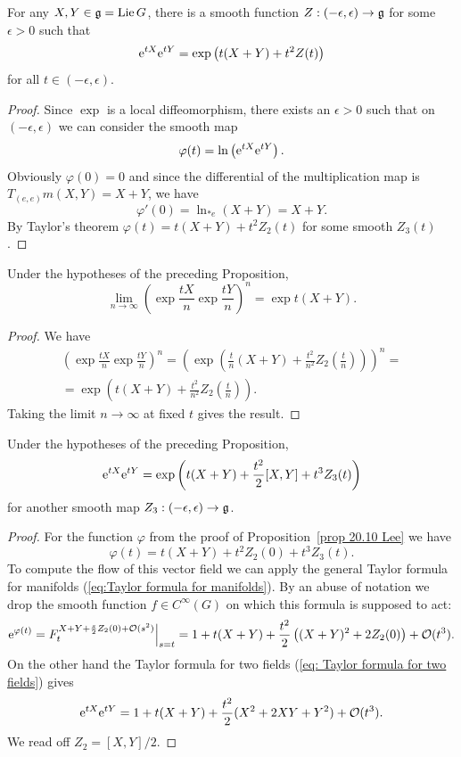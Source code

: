 \begin{prop}\label{prop 20.10 Lee}
    For any $X,Y\in\mathfrak{g}=\operatorname{Lie} G$, there is a smooth function $Z:(-\epsilon,\epsilon)\to \mathfrak{g}$ for some $\epsilon>0$ such that
    \[\mathrm{e}^{tX}\mathrm{e}^{tY}=\exp\left(t(X+Y)+t^2Z(t)\right)\]
    for all $t\in(-\epsilon,\epsilon)$.
\end{prop}
\begin{proof}
    Since $\exp$ is a local diffeomorphism, there exists an $\epsilon>0$ such that on $(-\epsilon,\epsilon)$ we can consider the smooth map
    \[\varphi(t)=\ln\left(\mathrm{e}^{tX}\mathrm{e}^{tY}\right).\]
    Obviously $\varphi(0)=0$ and since the differential of the multiplication map is $T_{(e,e)}m(X,Y)=X+Y$, we have
    \[\varphi'(0)=\ln_{\ast e}(X+Y)=X+Y.\]
    By Taylor's theorem $\varphi(t)=t(X+Y)+t^2Z_2(t)$ for some smooth $Z_3(t)$.
\end{proof}
\begin{cor}\label{cor 20.11 Lee}
    Under the hypotheses of the preceding Proposition,
    \[\lim_{n\to\infty}\left(\exp \frac{tX}{n}\exp \frac{tY}{n}\right)^n=\exp t(X+Y).\]
\end{cor}
\begin{proof}
    We have 
    \begin{multline}
        \left(\exp \frac{tX}{n}\exp \frac{tY}{n}\right)^n=\left(\exp\left(\frac{t}{n}(X+Y)+\frac{t^2}{n^2}Z_2\left(\frac{t}{n}\right)\right)\right)^n=\\
        =\exp\left(t(X+Y)+\frac{t^2}{n^2}Z_2\left(\frac tn\right)\right).
    \end{multline}
    Taking the limit $n\to\infty$ at fixed $t$ gives the result.
\end{proof}

\begin{prop}
    Under the hypotheses of the preceding Proposition, 
    \[\mathrm{e}^{tX}\mathrm{e}^{tY}=\exp\left(t(X+Y)+\frac{t^2}{2}[X,Y]+t^3Z_3(t)\right)\]
    for another smooth map $Z_3:(-\epsilon,\epsilon)\to \mathfrak{g}$.
\end{prop}
\begin{proof}
    For the function $\varphi$ from the proof of Proposition~\ref{prop 20.10 Lee} we have
    \[\varphi(t)=t(X+Y)+t^2Z_2(0)+t^3Z_3(t).\]
    To compute the flow of this vector field we can apply the general Taylor formula for manifolds (\ref{eq:Taylor formula for manifolds}). By an abuse of notation we drop the smooth function $f\in C^\infty(G)$ on which this formula is supposed to act:
    \[\rme^{\varphi(t)}=\restr{F^{X+Y+\frac{s}{2}Z_2(0)+\calO(s^2)}_t}{s=t}=1+t(X+Y)+\frac{t^2}{2}\left((X+Y)^2+2Z_2(0)\right)+\calO(t^3).\]
    On the other hand the Taylor formula for two fields (\ref{eq: Taylor formula for two fields}) gives
    \[\mathrm{e}^{tX}\mathrm{e}^{tY}=1+t(X+Y)+\frac{t^2}{2}(X^2+2XY+Y^2)+\mathcal{O}(t^3).\]
    We read off $Z_2=[X,Y]/2$.
\end{proof}

